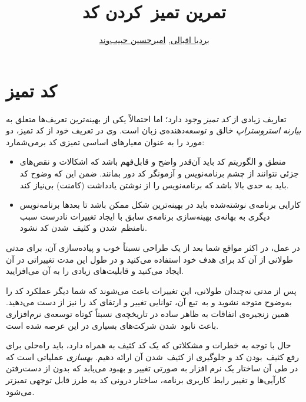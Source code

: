 \documentclass{utap}
\title{تمرین  تمیز~کردن کد}
\author{
    \href{mailto:bardia.eghbali@gmail.com?subject=[AP\%20S98\%20Refactoring]\%20}{بردیا اقبالی},
    \href{mailto:ahhabibvand@gmail.com?subject=[AP\%20S98\%20Refactoring]\%20}{امیرحسین حبیب‌وند}
}
\begin{document}
\maketitle

\section{کد تمیز}
تعاریف زیادی از
\textit{کد تمیز}
وجود دارد؛ اما احتمالاً یکی از بهینه‌ترین تعریف‌ها متعلق به
\textit{بیارنه استروستراپ}
خالق و توسعه‌دهنده‌ی زبان  است. وی در تعریف خود از کد تمیز، دو مورد را به عنوان معیار‌های اساسی تمیزی کد برمی‌شمارد:
\begin{itemize}
\item
منطق و الگوریتم کد باید آن‌قدر واضح و قابل‌فهم باشد که اشکالات و نقص‌های ﺟﺰﺋﯽ نتوانند از چشم برنامه‌نویس و آزمونگر کد دور بمانند. ضمن این که وضوح کد باید به حدی بالا باشد که برنامه‌نویس را از نوشتن یادداشت (کامنت) بی‌نیاز کند.

\item
کارایی
برنامه‌ی نوشته‌شده باید در بهینه‌ترین
شکل ممکن باشد تا بعدها برنامه‌نویس دیگری به بهانه‌ی بهینه‌سازی
برنامه‌ی سابق با ایجاد تغییرات نادرست سبب نامنظم~شدن و کثیف~شدن کد نشود.
\end{itemize}

در عمل، در اکثر مواقع شما بعد از یک طراحی نسبتاً خوب و پیاده‌سازی آن، برای مدتی طولانی از آن کد برای هدف خود استفاده می‌کنید و در طول این مدت تغییراتی در آن ایجاد می‌کنید و قابلیت‌های زیادی را به آن می‌افزایید.


پس از مدتی نه‌چندان طولانی، این تغییرات باعث می‌شوند که شما دیگر عملکرد کد را به‌وضوح متوجه نشوید و به~تبع آن، توانایی تغییر و ارتقای کد را نیز از دست می‌دهید. همین زنجیره‌ی اتفاقات به ظاهر ساده در تاریخچه‌ی نسبتاً کوتاه توسعه‌ی نرم‌افزاری باعث نابود~شدن شرکت‌های بسیاری در این عرصه شده است.

حال با توجه به خطرات و مشکلاتی که یک کد کثیف به همراه دارد، باید راه‌حلی برای رفع کثیف~بودن کد و جلو‌‌گیری از کثیف~شدن آن ارائه دهیم.
\textit{بهسازی} عملیاتی است که در طی آن ساختار یک نرم افزار به صورتی تغییر و بهبود می‌یابد که بدون از دست‌رفتن کارآیی‌ها و تغییر رابط کاربری برنامه، ساختار درونی کد به طرز قابل توجهی تمیزتر می‌شود.
\end{document}
